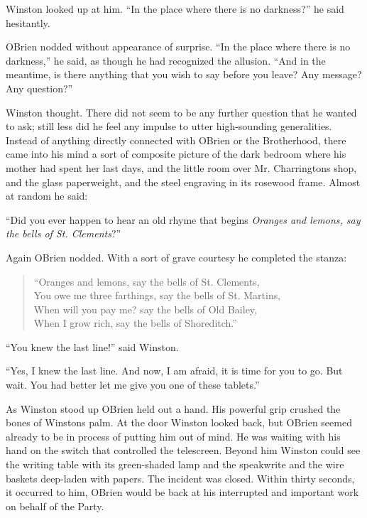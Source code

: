 Winston looked up at him. ``In the place where there is no darkness?'' he
said hesitantly.

O\textquotesingle Brien nodded without appearance of surprise. ``In the
place where there is no darkness,'' he said, as though he had recognized
the allusion. ``And in the meantime, is there anything that you wish to
say before you leave? Any message? Any question?''

Winston thought. There did not seem to be any further question that he
wanted to ask; still less did he feel any impulse to utter high-sounding
generalities. Instead of anything directly connected with
O\textquotesingle Brien or the Brotherhood, there came into his mind a
sort of composite picture of the dark bedroom where his mother had spent
her last days, and the little room over Mr.
Charrington\textquotesingle s shop, and the glass paperweight, and the
steel engraving in its rosewood frame. Almost at random he said:

``Did you ever happen to hear an old rhyme that begins \emph{Oranges and
lemons, say the bells of St. Clement\textquotesingle s}?''

Again O\textquotesingle Brien nodded. With a sort of grave courtesy he
completed the stanza:

\begin{quotation}
  ``Oranges and lemons, say the bells of St. Clement\textquotesingle s,\\
  You owe me three farthings, say the bells of St. Martin\textquotesingle s,\\
  When will you pay me? say the bells of Old Bailey,\\
  When I grow rich, say the bells of Shoreditch.''
\end{quotation}

``You knew the last line!'' said Winston.

``Yes, I knew the last line. And now, I am afraid, it is time for you to
go. But wait. You had better let me give you one of these tablets.''

As Winston stood up O\textquotesingle Brien held out a hand. His
powerful grip crushed the bones of Winston\textquotesingle s palm. At
the door Winston looked back, but O\textquotesingle Brien seemed already
to be in process of putting him out of mind. He was waiting with his
hand on the switch that controlled the telescreen. Beyond him Winston
could see the writing table with its green-shaded lamp and the
speakwrite and the wire baskets deep-laden with papers. The incident was
closed. Within thirty seconds, it occurred to him,
O\textquotesingle Brien would be back at his interrupted and important
work on behalf of the Party.


